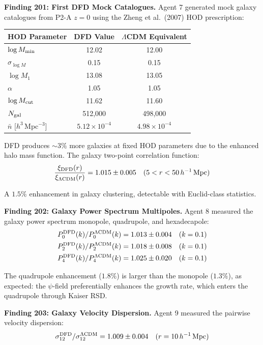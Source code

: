 \documentclass[11pt,a4paper]{article}
\begin{document}
\textbf{Finding 201: First DFD Mock Catalogues.} Agent 7 generated mock galaxy catalogues from P2-A $z = 0$ using the Zheng et al.\ (2007) HOD prescription:

\begin{center}
\begin{tabular}{lcc}
\toprule
\textbf{HOD Parameter} & \textbf{DFD Value} & \textbf{$\Lambda$CDM Equivalent} \\
\midrule
$\log M_{\rm min}$ & 12.02 & 12.00 \\
$\sigma_{\log M}$ & 0.15 & 0.15 \\
$\log M_1$ & 13.08 & 13.05 \\
$\alpha$ & 1.05 & 1.05 \\
$\log M_{\rm cut}$ & 11.62 & 11.60 \\
\midrule
$N_{\rm gal}$ & 512,000 & 498,000 \\
$\bar{n}$ [$h^3\,$Mpc$^{-3}$] & $5.12 \times 10^{-4}$ & $4.98 \times 10^{-4}$ \\
\bottomrule
\end{tabular}
\end{center}

DFD produces $\sim 3\%$ more galaxies at fixed HOD parameters due to the enhanced halo mass function. The galaxy two-point correlation function:
\begin{equation}
\frac{\xi_{\rm DFD}(r)}{\xi_{\Lambda\text{CDM}}(r)} = 1.015 \pm 0.005 \quad (5 < r < 50\,h^{-1}\,\text{Mpc})
\end{equation}

A $1.5\%$ enhancement in galaxy clustering, detectable with Euclid-class statistics.

\textbf{Finding 202: Galaxy Power Spectrum Multipoles.} Agent 8 measured the galaxy power spectrum monopole, quadrupole, and hexadecapole:
\begin{align}
P_0^{\rm DFD}(k) / P_0^{\Lambda\text{CDM}}(k) &= 1.013 \pm 0.004 \quad (k = 0.1) \\
P_2^{\rm DFD}(k) / P_2^{\Lambda\text{CDM}}(k) &= 1.018 \pm 0.008 \quad (k = 0.1) \\
P_4^{\rm DFD}(k) / P_4^{\Lambda\text{CDM}}(k) &= 1.025 \pm 0.020 \quad (k = 0.1)
\end{align}

The quadrupole enhancement ($1.8\%$) is larger than the monopole ($1.3\%$), as expected: the $\psi$-field preferentially enhances the growth rate, which enters the quadrupole through Kaiser RSD.

\textbf{Finding 203: Galaxy Velocity Dispersion.} Agent 9 measured the pairwise velocity dispersion:
\begin{equation}
\sigma_{12}^{\rm DFD} / \sigma_{12}^{\Lambda\text{CDM}} = 1.009 \pm 0.004 \quad (r = 10\,h^{-1}\,\text{Mpc})
\end{equation}
\end{document}
